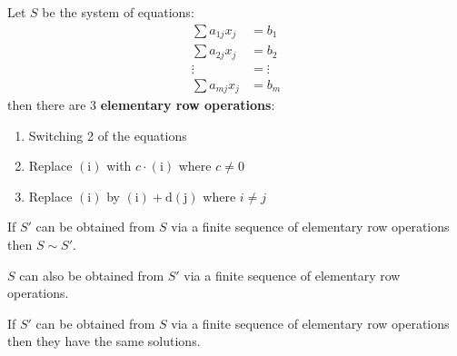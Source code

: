 \begin{definition} 
    Let \(S\) be the system of equations:
    \begin{align}
        \sum a_{1j}x_j & = b_1 \tag{1}     \\
        \sum a_{2j}x_j & = b_2  \tag{2}    \\
        \vdots         & =\vdots \nonumber \\
        \sum a_{mj}x_j & = b_m \tag{m}
    \end{align}
    then there are 3 \textbf{elementary row operations}:
    \begin{enumerate}
        \item Switching 2 of the equations
        \item Replace \(\mathrm{(i)}\) with \(c \cdot \mathrm{(i)}\) where \(c \neq 0\)
        \item Replace \(\mathrm{(i)}\) by \(\mathrm{(i) + d(j)}\) where \(i\neq j\)
    \end{enumerate}
\end{definition}

\begin{proposition}
    If \(S'\) can be obtained from \(S\) via a finite sequence of elementary row operations then \(S \sim S'\). 
\end{proposition}

\begin{corollary}
    \(S\) can also be obtained from \(S'\) via a finite sequence of elementary row operations.
\end{corollary}
\begin{corollary}
    If \(S'\) can be obtained from \(S\) via a finite sequence of elementary row operations then they have the same solutions.
\end{corollary}
